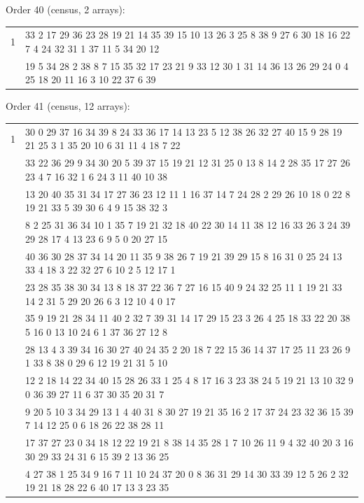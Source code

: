 \documentclass[11pt]{article}
\begin{document}
\vspace{2.5em}

\noindent Order 40 (census, 2 arrays):\par\nopagebreak
\begingroup\small
\noindent\begin{tabular}{@{}r@{\hskip 8pt}>{\ttfamily\raggedright\arraybackslash}p{}@{}}
\toprule
1 & 0 33 2 17 29 36 23 28 19 21 14 35 39 15 10 13 26 3 25 8 38 9 27 6 30 18 16 22 7 4 24 32 31 1 37 11 5 34 20 12\\
\addlinespace
2 & 27 19 5 34 28 2 38 8 7 15 35 32 17 23 21 9 33 12 30 1 31 14 36 13 26 29 24 0 4 25 18 20 11 16 3 10 22 37 6 39\\
\bottomrule
\end{tabular}
\endgroup

\vspace{2.5em}

\noindent Order 41 (census, 12 arrays):\par\nopagebreak
\begingroup\small
\noindent\begin{tabular}{@{}r@{\hskip 8pt}>{\ttfamily\raggedright\arraybackslash}p{}@{}}
\toprule
1 & 2 30 0 29 37 16 34 39 8 24 33 36 17 14 13 23 5 12 38 26 32 27 40 15 9 28 19 21 25 3 1 35 20 10 6 31 11 4 18 7 22\\
\addlinespace
2 & 18 33 22 36 29 9 34 30 20 5 39 37 15 19 21 12 31 25 0 13 8 14 2 28 35 17 27 26 23 4 7 16 32 1 6 24 3 11 40 10 38\\
\addlinespace
3 & 25 13 20 40 35 31 34 17 27 36 23 12 11 1 16 37 14 7 24 28 2 29 26 10 18 0 22 8 19 21 33 5 39 30 6 4 9 15 38 32 3\\
\addlinespace
4 & 37 8 2 25 31 36 34 10 1 35 7 19 21 32 18 40 22 30 14 11 38 12 16 33 26 3 24 39 29 28 17 4 13 23 6 9 5 0 20 27 15\\
\addlinespace
5 & 23 40 36 30 28 37 34 14 20 11 35 9 38 26 7 19 21 39 29 15 8 16 31 0 25 24 13 33 4 18 3 22 32 27 6 10 2 5 12 17 1\\
\addlinespace
6 & 39 23 28 35 38 30 34 13 8 18 37 22 36 7 27 16 15 40 9 24 32 25 11 1 19 21 33 14 2 31 5 29 20 26 6 3 12 10 4 0 17\\
\addlinespace
7 & 30 35 9 19 21 28 34 11 40 2 32 7 39 31 14 17 29 15 23 3 26 4 25 18 33 22 20 38 5 16 0 13 10 24 6 1 37 36 27 12 8\\
\addlinespace
8 & 32 28 13 4 3 39 34 16 30 27 40 24 35 2 20 18 7 22 15 36 14 37 17 25 11 23 26 9 1 33 8 38 0 29 6 12 19 21 31 5 10\\
\addlinespace
9 & 29 12 2 18 14 22 34 40 15 28 26 33 1 25 4 8 17 16 3 23 38 24 5 19 21 13 10 32 9 0 36 39 27 11 6 37 30 35 20 31 7\\
\addlinespace
10 & 33 9 20 5 10 3 34 29 13 1 4 40 31 8 30 27 19 21 35 16 2 17 37 24 23 32 36 15 39 7 14 12 25 0 6 18 26 22 38 28 11\\
\addlinespace
11 & 5 17 37 27 23 0 34 18 12 22 19 21 8 38 14 35 28 1 7 10 26 11 9 4 32 40 20 3 16 30 29 33 24 31 6 15 39 2 13 36 25\\
\addlinespace
12 & 15 4 27 38 1 25 34 9 16 7 11 10 24 37 20 0 8 36 31 29 14 30 33 39 12 5 26 2 32 19 21 18 28 22 6 40 17 13 3 23 35\\
\bottomrule
\end{tabular}
\endgroup
\end{document}
